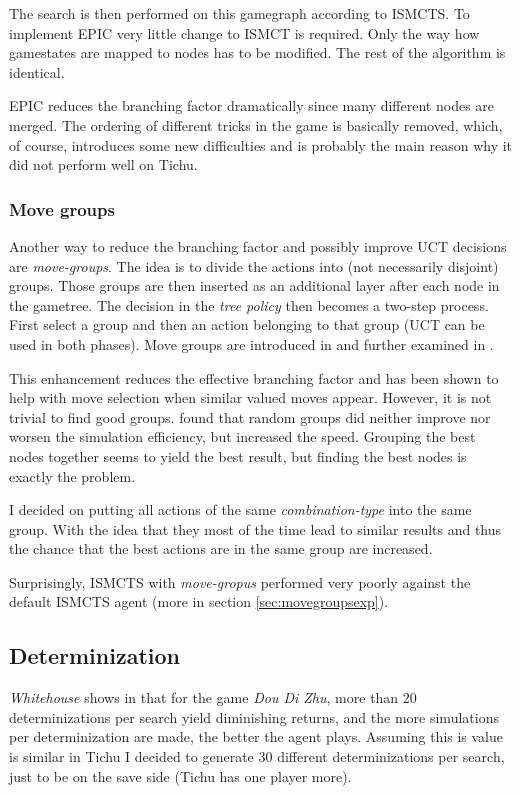 The search is then performed on this gamegraph according to ISMCTS. To implement EPIC very little change to ISMCT is required. Only the way how gamestates are mapped to nodes has to be modified. The rest of the algorithm is identical.

EPIC reduces the branching factor dramatically since many different nodes are merged. The ordering of different tricks in the game is basically removed, which, of course, introduces some new difficulties and is probably the main reason why it did not perform well on Tichu.

\subsubsection{Move groups}
Another way to reduce the branching factor and possibly improve UCT decisions are \textit{move-groups}.
The idea is to divide the actions into (not necessarily disjoint) groups. Those groups are then inserted as an additional layer after each node in the gametree.
The decision in the \textit{tree policy} then becomes a two-step process. First select a group and then an action belonging to that group (UCT can be used in both phases).
Move groups are introduced in \cite{movegroups} and further examined in \cite{movegroups2}.

This enhancement reduces the effective branching factor and has been shown to help with move selection when similar valued moves appear. However, it is not trivial to find good groups. \cite{movegroups2} found that random groups did neither improve nor worsen the simulation efficiency, but increased the speed. Grouping the best nodes together seems to yield the best result, but finding the best nodes is exactly the problem.

I decided on putting all actions of the same \textit{combination-type} into the same group. With the idea that they most of the time lead to similar results and thus the chance that the best actions are in the same group are increased.

Surprisingly, ISMCTS with \textit{move-gropus} performed very poorly against the default ISMCTS agent (more in section \ref{sec:movegroupsexp}).


\subsection{Determinization}
\label{sec:determinization}
\textit{Whitehouse} shows in \cite[p.~54+]{whitehouse14} that for the game \textit{Dou Di Zhu}, more than 20 determinizations per search yield diminishing returns, and the more simulations per determinization are made, the better the agent plays.
Assuming this is value is similar in Tichu I decided to generate 30 different determinizations per search, just to be on the save side (Tichu has one player more).

